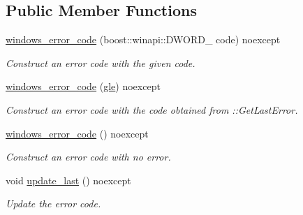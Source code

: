 \subsection*{Public Member Functions}
\begin{DoxyCompactItemize}
\item 
\mbox{\label{classdistant_1_1error_1_1windows__error__code_a79178309b742d651f897310cb42c4ffc}} 
\mbox{\hyperlink{classdistant_1_1error_1_1windows__error__code_a79178309b742d651f897310cb42c4ffc}{windows\+\_\+error\+\_\+code}} (boost\+::winapi\+::\+D\+W\+O\+R\+D\+\_\+ code) noexcept
\begin{DoxyCompactList}\small\item\em Construct an error code with the given code. \end{DoxyCompactList}\item 
\mbox{\label{classdistant_1_1error_1_1windows__error__code_a2161718f19065dd703e9dce8a43a02e9}} 
\mbox{\hyperlink{classdistant_1_1error_1_1windows__error__code_a2161718f19065dd703e9dce8a43a02e9}{windows\+\_\+error\+\_\+code}} (\mbox{\hyperlink{structdistant_1_1error_1_1gle}{gle}}) noexcept
\begin{DoxyCompactList}\small\item\em Construct an error code with the code obtained from \+::\+Get\+Last\+Error. \end{DoxyCompactList}\item 
\mbox{\label{classdistant_1_1error_1_1windows__error__code_af7c2a999f121500dfd5be60a2d3e62ee}} 
\mbox{\hyperlink{classdistant_1_1error_1_1windows__error__code_af7c2a999f121500dfd5be60a2d3e62ee}{windows\+\_\+error\+\_\+code}} () noexcept
\begin{DoxyCompactList}\small\item\em Construct an error code with no error. \end{DoxyCompactList}\item 
\mbox{\label{classdistant_1_1error_1_1windows__error__code_a39a117bda3aed58ff21b5dff64488314}} 
void \mbox{\hyperlink{classdistant_1_1error_1_1windows__error__code_a39a117bda3aed58ff21b5dff64488314}{update\+\_\+last}} () noexcept
\begin{DoxyCompactList}\small\item\em Update the error code. \end{DoxyCompactList}\item 

\end{DoxyCompactItemize}

